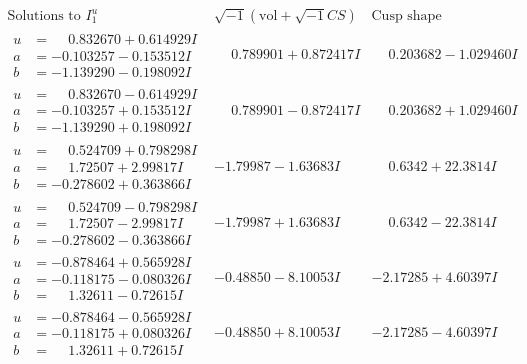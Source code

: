 \documentclass[1p]{elsarticle_modified}
\theoremstyle{definition}
\newcommand{\I}{\sqrt{-1}}
\begin{document}
$$\begin{array}{c|c|c}  
\text{Solutions to }I^u_{1}& \I (\text{vol} + \sqrt{-1}CS) & \text{Cusp shape}\\
 \hline 
\begin{aligned}
u &= \phantom{-}0.832670 + 0.614929 I \\
a &= -0.103257 - 0.153512 I \\
b &= -1.139290 - 0.198092 I\end{aligned}
 & \phantom{-}0.789901 + 0.872417 I & \phantom{-}0.203682 - 1.029460 I \\ \hline\begin{aligned}
u &= \phantom{-}0.832670 - 0.614929 I \\
a &= -0.103257 + 0.153512 I \\
b &= -1.139290 + 0.198092 I\end{aligned}
 & \phantom{-}0.789901 - 0.872417 I & \phantom{-}0.203682 + 1.029460 I \\ \hline\begin{aligned}
u &= \phantom{-}0.524709 + 0.798298 I \\
a &= \phantom{-}1.72507 + 2.99817 I \\
b &= -0.278602 + 0.363866 I\end{aligned}
 & -1.79987 - 1.63683 I & \phantom{-}0.6342 + 22.3814 I \\ \hline\begin{aligned}
u &= \phantom{-}0.524709 - 0.798298 I \\
a &= \phantom{-}1.72507 - 2.99817 I \\
b &= -0.278602 - 0.363866 I\end{aligned}
 & -1.79987 + 1.63683 I & \phantom{-}0.6342 - 22.3814 I \\ \hline\begin{aligned}
u &= -0.878464 + 0.565928 I \\
a &= -0.118175 - 0.080326 I \\
b &= \phantom{-}1.32611 - 0.72615 I\end{aligned}
 & -0.48850 - 8.10053 I & -2.17285 + 4.60397 I \\ \hline\begin{aligned}
u &= -0.878464 - 0.565928 I \\
a &= -0.118175 + 0.080326 I \\
b &= \phantom{-}1.32611 + 0.72615 I\end{aligned}
 & -0.48850 + 8.10053 I & -2.17285 - 4.60397 I \\ \hline\begin{aligned}

\end{aligned}
\end{array}$$
\end{document}
